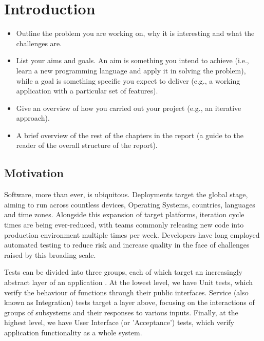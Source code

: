 \section{Introduction}
\label{sec:intro}

\begin{mdframed}
	\begin{itemize}
		\item Outline the problem you are working on, why it is interesting and what the challenges are.
		\item List your aims and goals. An aim is something you intend to achieve (i.e., learn a new programming language and apply it in solving the problem), while a goal is something specific you expect to deliver (e.g., a working application with a particular set of features).
		\item Give an overview of how you carried out your project (e.g., an iterative approach).
		\item A brief overview of the rest of the chapters in the report (a guide to the reader of the overall structure of the report).
	\end{itemize}
\end{mdframed}

\subsection{Motivation}

Software, more than ever, is ubiquitous. Deployments target the global stage, aiming to run across countless devices, Operating Systems, countries, languages and time zones. Alongside this expansion of target platforms, iteration cycle times are being ever-reduced, with teams commonly releasing new code into production environment multiple times per week. Developers have long employed automated testing to reduce risk and increase quality in the face of challenges raised by this broading scale.

Tests can be divided into three groups, each of which target an increasingly abstract layer of an application \citep[see][Chapter~16]{cohn2009succeeding}. At the lowest level, we have Unit tests, which verify the behaviour of functions through their public interfaces. Service (also known as Integration) tests target a layer above, focusing on the interactions of groups of subsystems and their responses to various inputs. Finally, at the highest level, we have User Interface (or 'Acceptance') tests, which verify application functionality as a whole system.

